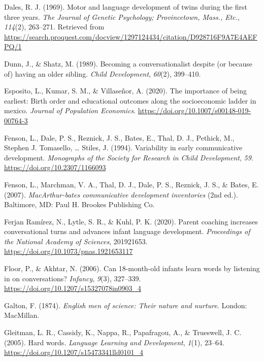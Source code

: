\documentclass[
  english,
  man,floatsintext]{apa6}
\begin{document}
\leavevmode\hypertarget{ref-dales_motor_1969}{}%
Dales, R. J. (1969). Motor and language development of twins during the first three years. \emph{The Journal of Genetic Psychology; Provincetown, Mass., Etc.}, \emph{114}(2), 263--271. Retrieved from \url{https://search.proquest.com/docview/1297124434/citation/D928716F9A7E4AEFPQ/1}

\leavevmode\hypertarget{ref-dunn_becoming_1989}{}%
Dunn, J., \& Shatz, M. (1989). Becoming a conversationalist despite (or because of) having an older sibling. \emph{Child Development}, \emph{60}(2), 399--410.

\leavevmode\hypertarget{ref-esposito_importance_2020}{}%
Esposito, L., Kumar, S. M., \& Villaseñor, A. (2020). The importance of being earliest: Birth order and educational outcomes along the socioeconomic ladder in mexico. \emph{Journal of Population Economics}. \url{https://doi.org/10.1007/s00148-019-00764-3}

\leavevmode\hypertarget{ref-fenson_variability_1994}{}%
Fenson, L., Dale, P. S., Reznick, J. S., Bates, E., Thal, D. J., Pethick, M., Stephen J. Tomasello, \ldots{} Stiles, J. (1994). Variability in early communicative development. \emph{Monographs of the Society for Research in Child Development}, \emph{59}. \url{https://doi.org/10.2307/1166093}

\leavevmode\hypertarget{ref-fenson_macarthur-bates_2007}{}%
Fenson, L., Marchman, V. A., Thal, D. J., Dale, P. S., Reznick, J. S., \& Bates, E. (2007). \emph{MacArthur-bates communicative development inventories} (2nd ed.). Baltimore, MD: Paul H. Brookes Publishing Co.

\leavevmode\hypertarget{ref-ferjan_ramirez_parent_2020}{}%
Ferjan Ramírez, N., Lytle, S. R., \& Kuhl, P. K. (2020). Parent coaching increases conversational turns and advances infant language development. \emph{Proceedings of the National Academy of Sciences}, 201921653. \url{https://doi.org/10.1073/pnas.1921653117}

\leavevmode\hypertarget{ref-floor_can_2006}{}%
Floor, P., \& Akhtar, N. (2006). Can 18-month-old infants learn words by listening in on conversations? \emph{Infancy}, \emph{9}(3), 327--339. \url{https://doi.org/10.1207/s15327078in0903_4}

\leavevmode\hypertarget{ref-galton_english_1874}{}%
Galton, F. (1874). \emph{English men of science: Their nature and nurture}. London: MacMillan.

\leavevmode\hypertarget{ref-gleitman_hard_2005}{}%
Gleitman, L. R., Cassidy, K., Nappa, R., Papafragou, A., \& Trueswell, J. C. (2005). Hard words. \emph{Language Learning and Development}, \emph{1}(1), 23--64. \url{https://doi.org/10.1207/s15473341lld0101_4}
\end{document}
